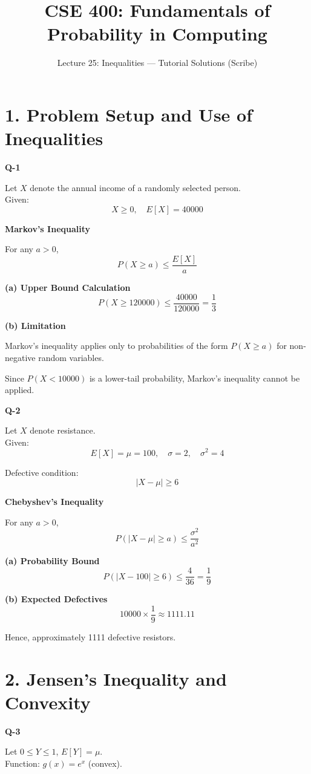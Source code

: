 \documentclass[12pt]{article}
\begin{document}
\title{CSE 400: Fundamentals of Probability in Computing}
\author{Lecture 25: Inequalities — Tutorial Solutions (Scribe)}
\date{}
\maketitle
\section*{1. Problem Setup and Use of Inequalities}

\textbf{Q-1}

Let $X$ denote the annual income of a randomly selected person.\\
Given: 
\[
X \ge 0, \quad E[X] = 40000
\]

\textbf{Markov’s Inequality}

For any $a > 0$,
\[
P(X \ge a) \le \frac{E[X]}{a}
\]

\textbf{(a) Upper Bound Calculation}
\[
P(X \ge 120000) \le \frac{40000}{120000} = \frac{1}{3}
\]

\textbf{(b) Limitation}

Markov’s inequality applies only to probabilities of the form $P(X \ge a)$ for non-negative random variables.

Since $P(X < 10000)$ is a lower-tail probability, Markov’s inequality cannot be applied.

\textbf{Q-2}

Let $X$ denote resistance.\\
Given:
\[
E[X] = \mu = 100, \quad \sigma = 2, \quad \sigma^2 = 4
\]

Defective condition:
\[
|X - \mu| \ge 6
\]

\textbf{Chebyshev’s Inequality}

For any $a > 0$,
\[
P(|X - \mu| \ge a) \le \frac{\sigma^2}{a^2}
\]

\textbf{(a) Probability Bound}
\[
P(|X - 100| \ge 6) \le \frac{4}{36} = \frac{1}{9}
\]

\textbf{(b) Expected Defectives}
\[
10000 \times \frac{1}{9} \approx 1111.11
\]

Hence, approximately 1111 defective resistors.

\section*{2. Jensen’s Inequality and Convexity}

\textbf{Q-3}

Let $0 \le Y \le 1$, $E[Y] = \mu$.\\
Function: $g(x) = e^x$ (convex).
\end{document}
